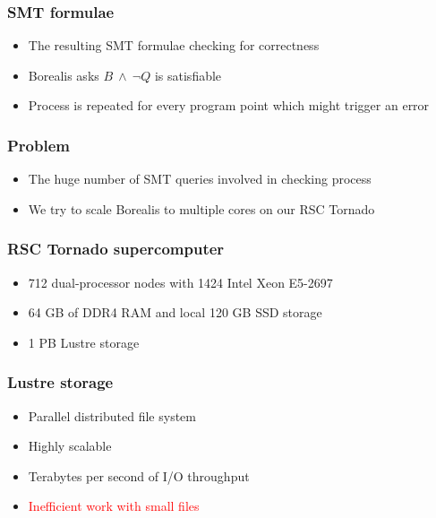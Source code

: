 \begin{frame}
	\frametitle{SMT formulae}
\begin{itemize}
	\item The resulting SMT formulae checking for correctness
	\item Borealis asks $B \ \wedge \ \neg Q$ is satisfiable
	\item Process is repeated for every program point which might trigger an error
\end{itemize}
\end{frame}


\begin{frame}
\frametitle{Problem}
	\begin{itemize}
		\item The huge number of SMT queries involved in checking process
		\item We try to scale Borealis to multiple cores on our RSC Tornado
	\end{itemize}
\end{frame}


\begin{frame}
\frametitle{RSC Tornado supercomputer}
\begin{itemize}
\item 712 dual-processor nodes with 1424 Intel Xeon E5-2697
\item 64 GB of DDR4 RAM and local 120 GB SSD storage
\item 1 PB Lustre storage
\end{itemize}
\end{frame}


\begin{frame}
\frametitle{Lustre storage}
\begin{itemize}
\item Parallel distributed file system
\item Highly scalable
\item Terabytes per second of I/O throughput
\item \textcolor{red}{Inefficient work with small files}
\end{itemize}
\end{frame}
